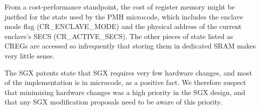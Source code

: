 From a cost-performance standpoint, the cost of register memory might be
justfied for the state used by the PMH microcode, which includes the enclave
mode flag (CR\_ENCLAVE\_MODE) and the physical address of the current enclave's
SECS (CR\_ACTIVE\_SECS). The other pieces of state listed as CREGs are accessed
so infrequently that storing them in dedicated SRAM makes very little sense.

The SGX patents state that SGX requires very few hardware changes, and most of
the implementation is in microcode, as a positive fact. We therefore suspect
that minimizing hardware changes was a high priority in the SGX design, and
that any SGX modification proposals need to be aware of this priority.
